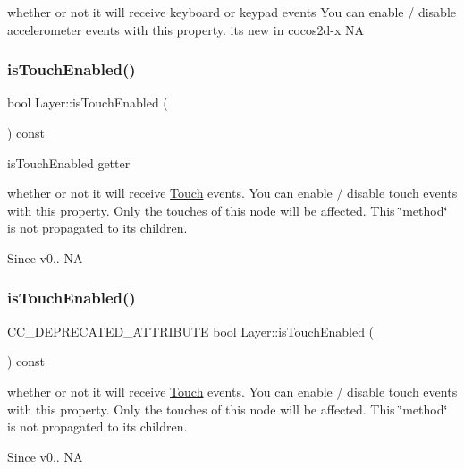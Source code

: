 whether or not it will receive keyboard or keypad events You can enable / disable accelerometer events with this property. it\textquotesingle{}s new in cocos2d-\/x  NA \mbox{\label{classLayer_a7adf5b4a876042d5a80364f652abe169}} 
\subsubsection{\texorpdfstring{is\+Touch\+Enabled()}{isTouchEnabled()}\hspace{0.1cm}{\footnotesize\ttfamily [1/2]}}
{\footnotesize\ttfamily bool Layer\+::is\+Touch\+Enabled (\begin{DoxyParamCaption}{ }\end{DoxyParamCaption}) const}



is\+Touch\+Enabled getter 

whether or not it will receive \hyperlink{classTouch}{Touch} events. You can enable / disable touch events with this property. Only the touches of this node will be affected. This \char`\"{}method\char`\"{} is not propagated to it\textquotesingle{}s children. \begin{DoxySince}{Since}
v0..  NA 
\end{DoxySince}
\mbox{\label{classLayer_a4a76db13ede97c17f458a93d4b14c183}} 
\subsubsection{\texorpdfstring{is\+Touch\+Enabled()}{isTouchEnabled()}\hspace{0.1cm}{\footnotesize\ttfamily [2/2]}}
{\footnotesize\ttfamily C\+C\+\_\+\+D\+E\+P\+R\+E\+C\+A\+T\+E\+D\+\_\+\+A\+T\+T\+R\+I\+B\+U\+TE bool Layer\+::is\+Touch\+Enabled (\begin{DoxyParamCaption}{ }\end{DoxyParamCaption}) const}

whether or not it will receive \hyperlink{classTouch}{Touch} events. You can enable / disable touch events with this property. Only the touches of this node will be affected. This \char`\"{}method\char`\"{} is not propagated to it\textquotesingle{}s children. \begin{DoxySince}{Since}
v0..  NA 
\end{DoxySince}
\mbox{\label{classLayer_aea2ec8f77681b4fd1c988bbeeb3d1c22}} 
